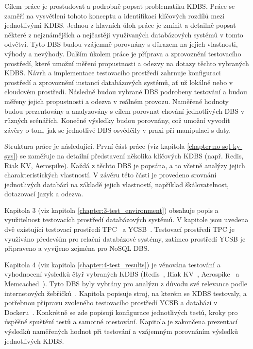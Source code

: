 \documentclass[czech,master,dept460,male,csharp,cpdeclaration]{diploma}
\begin{document}
	Cílem práce je prostudovat a podrobně popsat problematiku KDBS. Práce se zaměří na vysvětlení tohoto konceptu a identifikaci klíčových rozdílů mezi jednotlivými KDBS. Jednou z hlavních úloh práce je zmínit a detailně popsat některé z nejznámějších a nejčastěji využívaných databázových systémů v tomto odvětví. Tyto DBS budou vzájemně porovnány s důrazem na jejich vlastnosti, výhody a nevýhody. Dalším úkolem práce je příprava a zprovoznění testovacího prostředí, které umožní měření propustnosti a odezvy na dotazy těchto vybraných KDBS. Návrh a implementace testovacího prostředí zahrnuje konfiguraci prostředí a zprovoznění instancí databázových systémů, ať už lokálně nebo v cloudovém prostředí. Následně budou vybrané DBS podrobeny testování a budou měřeny jejich propustnosti a odezva v reálném provozu. Naměřené hodnoty budou prezentovány a analyzovány s cílem porovnat chování jednotlivých DBS v různých scénářích. Konečné výsledky budou porovnány, což umožní vyvodit závěry o tom, jak se jednotlivé DBS osvědčily v praxi při manipulaci s daty.
	
	Struktura práce je následující. První část práce (viz kapitola \ref{chapter:no-sql-ky-sys}) se zaměřuje na detailní představení několika klíčových KDBS (např. Redis, Riak KV, Aerospike). Každá z těchto DBS je popsána, a to včetně analýzy jejich charakteristických vlastností. V závěru této části je provedeno srovnání jednotlivých databází na základě jejich vlastností, například škálovatelnost, dotazovací jazyk a odezva.
	
	Kapitola 3 (viz kapitola \ref{chapter:3-test_environment}) obsahuje popis a využitelnost testovacích prostředí databázových systémů. V kapitole jsou uvedena dvě existující testovací prostředí TPC~\cite{tpc} a YCSB~\cite{ycsb}. Testovací prostředí TPC je využíváno především pro relační databázové systémy, zatímco prostředí YCSB je připraveno a vyvíjeno zejména pro NoSQL DBS.
	
	Kapitola 4 (viz kapitola \ref{chapter:4-test_results}) je věnována testování a vyhodnocení výsledků čtyř vybraných KDBS (Redis~\cite{redis}, Riak KV~\cite{riak}, Aerospike~\cite{aerospike} a Memcached~\cite{memcached}). Tyto DBS byly vybrány pro analýzu z důvodu své relevance podle internetových žebříčků~\cite{db-engineers-ranking, predictiveanalyticstoday}. Kapitola popisuje stroj, na kterém se KDBS testovaly, a potřebnou přípravu zvoleného testovacího prostředí YCSB a databází v Dockeru~\cite{docker}. Konkrétně se zde popisují konfigurace jednotlivých testů, kroky pro úspěšné spuštění testů a samotné otestování. Kapitola je zakončena prezentací výsledků naměřených hodnot při testování a vzájemným porovnáním výsledků jednotlivých KDBS. 
	
\end{document}
